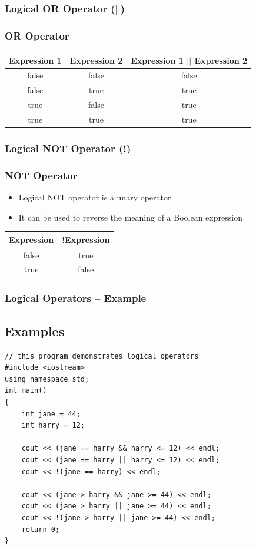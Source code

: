 \documentclass{beamer}
\begin{document}
\begin{frame}
    \frametitle{Logical OR Operator ($||$)}
    \subsubsection{OR Operator} %
    \label{ssub:or_operator}
    \begin{table}
        \begin{tabular}{c | c | c}
        Expression 1 & Expression 2 & Expression 1 $||$ Expression 2 \\
        \hline \hline
        false & false & false\\
        false & true & true\\
        true & false & true\\
        true & true & true
        \end{tabular}
    \end{table}
\end{frame}

\begin{frame}
    \frametitle{Logical NOT Operator (!)}
    \subsubsection{NOT Operator} %
    \label{ssub:not_operator}
    \begin{itemize}
        \item Logical NOT operator is a unary operator
        \item It can be used to reverse the meaning of a Boolean expression
    \end{itemize}
    \begin{table}
        \begin{tabular}{c | c}
        Expression & !Expression\\
        \hline \hline
        false & true\\
        true & false\\
        \end{tabular}
    \end{table}
\end{frame}

\begin{frame}[fragile]
    \frametitle{Logical Operators -- Example}
    \subsection{Examples} %
    \label{sub:examples_2}
    \lstset{style=mystyle}
    \begin{lstlisting}
// this program demonstrates logical operators
#include <iostream>
using namespace std;
int main()
{
    int jane = 44;
    int harry = 12;

    cout << (jane == harry && harry <= 12) << endl;
    cout << (jane == harry || harry <= 12) << endl;
    cout << !(jane == harry) << endl;

    cout << (jane > harry && jane >= 44) << endl;
    cout << (jane > harry || jane >= 44) << endl;
    cout << !(jane > harry || jane >= 44) << endl;
    return 0;
}\end{lstlisting}
\end{frame}
\end{document}
